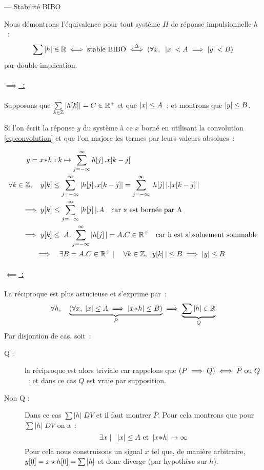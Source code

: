 \begin{demo} --- Stabilité BIBO

  
  Nous démontrons l'équivalence pour tout système $H$ de réponse
  impulsionnelle $h$~:
  $$ \sum \left|h\right|\in\mathbb{R} \iff \text{stable BIBO} \overset{\Delta}{\iff} \left(\forall x, \;\;\left|x\right|<A \implies \left|y\right|<B\right)$$  par
  double implication.
  
  \paragraph{\underline{$\implies$~:}}
  Supposons que $\sum\limits_{k\in\mathbb{Z}} \left|h\!\left[k\right]\right|=C\in\mathbb{R}^+$
  et que $\left|x\right|\leq A$~; et montrons que $\left|y\right|\leq B$.

  Si l'on écrit la réponse $y$ du système à ce $x$ borné en utilisant
  la convolution \eqref{eq:convolution} et que l'on majore les termes
  par leurs valeurs absolues~:

  \begin{align*}
    y=x\conv{}h &: k\mapsto \somme{j=-\infty}{\infty}{h\ded{j}.x\ded{k-j}} \\
    \forall k\in\Z,\quad y\ded{k} & \leq \somme{j=-\infty}{\infty}{\left|h\ded{j}.x\ded{k-j}\right|} = \somme{j=-\infty}{\infty}{|h\ded{j}|.|x\ded{k-j}|}\\
    \implies  y\ded{k} & \leq \somme{j=-\infty}{\infty}{|h\ded{j}| . A}\quad \text{car x est bornée par A}\\
    \implies  y\ded{k} & \leq \;A.\somme{j=-\infty}{\infty}{|h\ded{j}|} = A.C \in \R^+\quad \text{car h est absoluement sommable}\\
    \implies & \quad\exists B=A.C\in\R^+ \mathrel{}\mid\mathrel{}\quad \forall k\in\Z, \; |y\ded{k}|\leq B \implies \abs{y}\leq B
  \end{align*}

  \paragraph{\underline{$\impliedby$ :}}
  La réciproque est plus astucieuse et s'exprime par~:
  $$\forall h,\quad \underbrace{\left(\forall x,\; \left|x\right|\leq A \implies \left|x\!\ast\! h\right|\leq B\right)}_{P} \implies \underbrace{\sum|h|\in\mathbb{R}}_{Q}$$
  Par disjontion de cas, soit~:
  \begin{description}
  \item[Q :] la réciproque est alors triviale car rappelons que
    $\left(P\implies Q\right)\iff \overline{P} \text{ ou } Q$~: et dans ce cas
    $Q$ est vraie par supposition.
  \item[Non Q :] Dans ce cas $\sum|h|\; DV$ et il faut montrer
    $\overline{P}$. Pour cela montrons que pour $\sum|h|\; DV$ on a~:
    $$\exists x \mathrel{}\mid\mathrel{} \;\; \left|x\right|\leq A \text{ et } \left|x\!\ast\!
      h\right|\to\infty $$ Pour cela nous construisons un signal $x$ tel
    que, de manière arbitraire,
    $y\!\left[0\right]=x\star h\!\left[0\right] = \sum\left|h\right|$ et donc diverge (par
    hypothèse sur $h$).


\end{description}
\end{demo}
